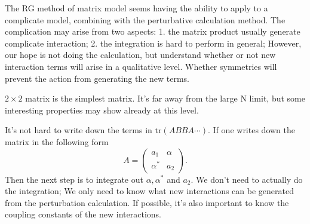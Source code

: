 The RG method of matrix model seems having the ability to apply to a complicate model,
combining with the perturbative calculation method.
The complication may arise from two aspects:
1. the matrix product usually generate complicate interaction;
2. the integration is hard to perform in general;
However, our hope is not doing the calculation,
but understand whether or not new interaction terms will arise in a qualitative level.
Whether symmetries will prevent the action from generating the new terms.

$2 \times 2$ matrix is the simplest matrix.
It's far away from the large N limit, but some interesting properties may show already at this level.

It's not hard to write down the terms in $\mathrm{tr}(ABBA\cdots)$.
If one writes down the matrix in the following form
\[
	A = \begin{pmatrix}
		a_1 & \alpha \\
		\alpha^* & a_2
	\end{pmatrix}
.\] 
Then the next step is to integrate out $\alpha,\alpha^*$ and $a_2$.
We don't need to actually do the integration;
We only need to know what new interactions can be generated from the perturbation calculation.
If possible, it's also important to know the coupling constants of the new interactions.
